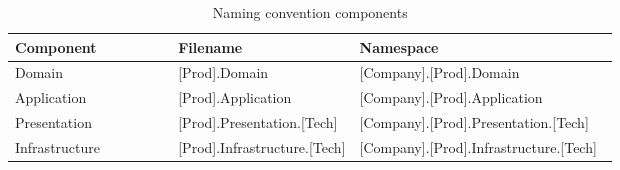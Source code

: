 \begin{table}[h]
    \small
    \begin{tabular}{ l p{0.30\linewidth} p{0.43\linewidth} }
    \hline
    \textbf{Component} & \textbf{Filename} & \textbf{Namespace} \\ 
    \hline
    Domain & [Prod].Domain & [Company].[Prod].Domain \\
    Application & [Prod].Application & [Company].[Prod].Application \\
    Presentation & [Prod].Presentation.[Tech] & [Company].[Prod].Presentation.[Tech] \\
    Infrastructure & [Prod].Infrastructure.[Tech] & [Company].[Prod].Infrastructure.[Tech]
    \\ \hline
    \end{tabular}
\caption{Naming convention components}
\label{table:component_naming_convention}
\end{table}


